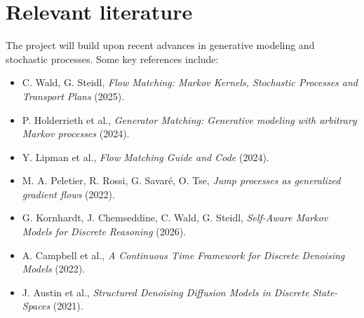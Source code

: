\documentclass[11pt, a4paper]{article}
\begin{document}
\section*{Relevant literature}
The project will build upon recent advances in generative modeling and stochastic processes. Some key references include:
\begin{itemize}[label={-}, leftmargin=*]
    \item C. Wald, G. Steidl, \textit{Flow Matching: Markov Kernels, Stochastic Processes and Transport Plans} (2025).
    \item P. Holderrieth et al., \textit{Generator Matching: Generative modeling with arbitrary Markov processes} (2024).
    \item Y. Lipman et al., \textit{Flow Matching Guide and Code} (2024).
    \item M. A. Peletier, R. Rossi, G. Savaré, O. Tse, \textit{Jump processes as generalized gradient flows} (2022).
    \item G. Kornhardt, J. Chemseddine, C. Wald, G. Steidl, \textit{Self-Aware Markov Models for Discrete Reasoning} (2026).
    \item A. Campbell et al., \textit{A Continuous Time Framework for Discrete Denoising Models} (2022).
    \item J. Austin et al., \textit{Structured Denoising Diffusion Models in Discrete State-Spaces} (2021).
\end{itemize}
\end{document}
